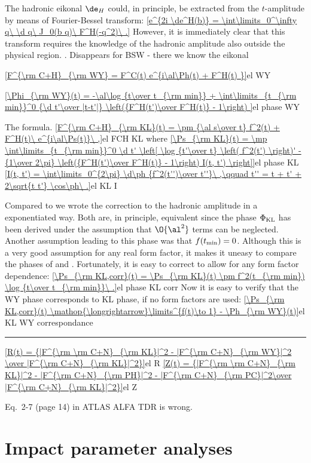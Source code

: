 The hadronic eikonal $\de_H$ could, in principle, be extracted from the $t$-amplitude by means of Fourier-Bessel transform:
\eqref{e^{2i \de^H(b)} = \int\limits_0^\infty q\ \d q\ J_0(b q)\ F^H(-q^2)\ .}{}
However, it is immediately clear that this transform requires the knowledge of the hadronic amplitude also outside the physical region.
. Disappears for BSW - there we know the eikonal


\eqref{F^{\rm C+H}_{\rm WY} = F^C(t) e^{i\al\Ph(t) + F^H(t) }}{el WY}

\eqref{\Phi_{\rm WY}(t) =  -\al\log {t\over t_{\rm min}} + \int\limits_{t_{\rm min}}^0 {\d t'\over |t-t'|} \left({F^H(t')\over F^H(t)} - 1\right) }{el phase WY}


The \KL{} formula.
\eqref{F^{\rm C+H}_{\rm KL}(t) = \pm {\al s\over t} f^2(t) + F^H(t)\ e^{i\al\Ps(t)}\ ,}{el FCH KL}
where
\eqref{\Ps_{\rm KL}(t) = \mp \int\limits_{t_{\rm min}}^0 \d t' \left[ \log {t'\over t} \left( f^2(t') \right)' - {1\over 2\pi} \left({F^H(t')\over F^H(t)} - 1\right) I(t, t') \right]}{el phase KL}
\eqref{I(t, t') = \int\limits_0^{2\pi} \d\ph {f^2(t'')\over t''}\ ,\qquad t'' = t + t' + 2\sqrt{t t'} \cos\ph\ .}{el KL I}

Compared to  we wrote the correction to the hadronic amplitude in a exponentiated way. Both are, in principle, equivalent since the phase $\Phi_{\rm KL}$ has been derived under the assumption that $\O{\al^2}$ terms can be neglected. Another assumption leading to this phase was that $f(t_{\rm min}) = 0$. Although this is a very good assumption for any real form factor, it makes it uneasy to compare the phases of \KL{} and \WY. Fortunately, it is easy to correct  to allow for any form factor dependence:
\eqref{\Ps_{\rm KL,corr}(t) = \Ps_{\rm KL}(t) \pm f^2(t_{\rm min}) \log {t\over t_{\rm min}}\ .}{el phase KL corr}
Now it is easy to verify that the WY phase corresponds to KL phase, if no form factors are used:
\eqref{\Ps_{\rm KL,corr}(t) \mathop{\longrightarrow}\limits^{f(t)\to 1} - \Ph_{\rm WY}(t)}{el KL WY correspondance}


\vskip1cm
\hrule

\eqref{R(t) = {|F^{\rm \rm C+N}_{\rm KL}|^2 - |F^{\rm C+N}_{\rm WY}|^2 \over |F^{\rm C+N}_{\rm KL}|^2}}{el R}
\eqref{Z(t) = {|F^{\rm \rm C+N}_{\rm KL}|^2 - |F^{\rm C+N}_{\rm PH}|^2 - |F^{\rm C+N}_{\rm PC}|^2\over |F^{\rm C+N}_{\rm KL}|^2}}{el Z}



Eq.~2-7 (page 14) in ATLAS ALFA TDR  is wrong.

\PrintReferences

\section[el impact]{Impact parameter analyses}

